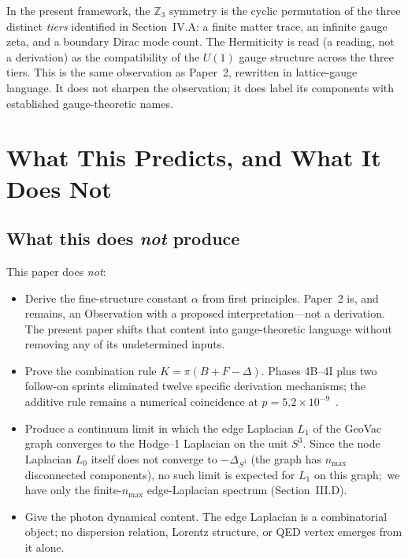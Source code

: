 \documentclass[aps,pra,twocolumn,superscriptaddress,longbibliography]{revtex4-2}
\begin{document}
In the present framework, the $\mathbb{Z}_3$ symmetry is the cyclic
permutation of the three distinct \emph{tiers} identified in
Section~IV.A: a finite matter trace, an infinite gauge zeta, and a
boundary Dirac mode count.  The Hermiticity is read (a reading, not a
derivation) as the compatibility of the $U(1)$ gauge structure across the
three tiers.
This is the same observation as Paper~2, rewritten in
lattice-gauge language.  It does not sharpen the observation; it does
label its components with established gauge-theoretic names.


\section{What This Predicts, and What It Does Not}
\label{sec:predictions}

\subsection{What this does \emph{not} produce}

This paper does \emph{not}:
\begin{itemize}
\item Derive the fine-structure constant $\alpha$ from first
  principles.  Paper~2 is, and remains, an Observation with a
  proposed interpretation---not a derivation.  The present paper
  shifts that content into gauge-theoretic language without
  removing any of its undetermined inputs.
\item Prove the combination rule $K = \pi(B + F - \Delta)$.  Phases
  4B--4I plus two follow-on sprints eliminated twelve specific
  derivation mechanisms; the
  additive rule remains a numerical coincidence at $p = 5.2 \times
  10^{-9}$~\cite{Paper2}.
\item Produce a continuum limit in which the edge Laplacian
  $L_1$ of the GeoVac graph converges to the Hodge--1 Laplacian on
  the unit $S^3$.  Since the node Laplacian $L_0$ itself does not
  converge to $-\Delta_{S^3}$ (the graph has $n_{\max}$ disconnected
  components), no such limit is expected for $L_1$ on this graph;\ we
  have only the finite-$n_{\max}$ edge-Laplacian spectrum
  (Section~III.D).
\item Give the photon dynamical content.  The edge Laplacian is a
  combinatorial object; no dispersion relation, Lorentz structure,
  or QED vertex emerges from it alone.
\end{itemize}
\end{document}
